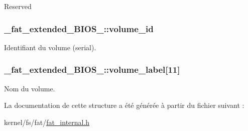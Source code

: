 Reserved \hypertarget{struct__fat__extended__BIOS__16_aa932fbe482a2da22749a6f9fa42fce59}{
\subsubsection[{volume\-\_\-id}]{ \-\_\-fat\-\_\-extended\-\_\-\-B\-I\-O\-S\-\_\-::volume\-\_\-id}}\label{struct__fat__extended__BIOS__16_aa932fbe482a2da22749a6f9fa42fce59}
Identifiant du volume (serial). \hypertarget{struct__fat__extended__BIOS__16_a0f859beb837eb3013ef4ad48dd0c9845}{
\subsubsection[{volume\-\_\-label}]{ \-\_\-fat\-\_\-extended\-\_\-\-B\-I\-O\-S\-\_\-::volume\-\_\-label\mbox{[}11\mbox{]}}}\label{struct__fat__extended__BIOS__16_a0f859beb837eb3013ef4ad48dd0c9845}
Nom du volume. 

La documentation de cette structure a été générée à partir du fichier suivant \-:\begin{DoxyCompactItemize}
\item 
kernel/fs/fat/\hyperlink{fat__internal_8h}{fat\-\_\-internal.\-h}\end{DoxyCompactItemize}
